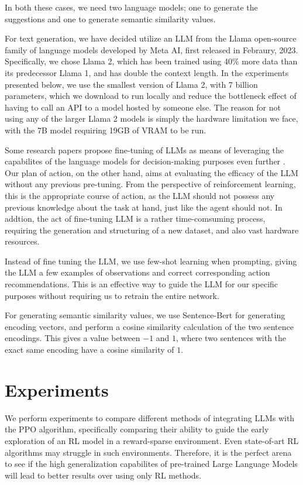 \documentclass[conference]{IEEEtran}
\begin{document}
In both these cases, we need two language models; one to generate the suggestions and one to generate semantic similarity values.

For text generation, we have decided utilize an LLM from the Llama open-source family of language models developed by Meta AI, first released in Febraury, 2023. Specifically, we chose Llama 2, which has been trained using 40\% more data than its predecessor Llama 1, and has double the context length\cite{llama}. In the experiments presented below, we use the smallest version of Llama 2, with 7 billion parameters, which we download to run locally and reduce the bottleneck effect of having to call an API to a model hosted by someone else. The reason for not using any of the larger Llama 2 models is simply the hardware limitation we face, with the 7B model requiring 19GB of VRAM to be run. 

Some research papers propose fine-tuning of LLMs as means of leveraging the capabilites of the language models for decision-making purposes even further \cite{grounding}. Our plan of action, on the other hand, aims at evaluating the efficacy of the LLM without any previous pre-tuning. From the perspective of reinforcement learning, this is the appropriate course of action, as the LLM should not possess any previous knowledge about the task at hand, just like the agent should not. In addtion, the act of fine-tuning LLM is a rather time-comsuming process, requiring the generation and structuring of a new dataset, and also vast hardware resources. 

Instead of fine tuning the LLM, we use few-shot learning when prompting, giving the LLM a few examples of observations and correct corresponding action recommendations. This is an effective way to guide the LLM for our specific purposes without requiring us to retrain the entire network.

For generating semantic similarity values, we use Sentence-Bert \cite{bert} for generating encoding vectors, and perform a cosine similarity calculation of the two sentence encodings. This gives a value between $-1$ and $1$, where two sentences with the exact same encoding have a cosine similarity of $1$.


\section{Experiments}

We perform experiments to compare different methods of integrating LLMs with the PPO algorithm, specifically comparing their ability to guide the early exploration of an RL model in a reward-sparse environment. Even state-of-art RL algorithms may struggle in such environments. Therefore, it is the perfect arena to see if the high generalization capabilites of pre-trained Large Language Models will lead to better results over using only RL methods.
\end{document}
